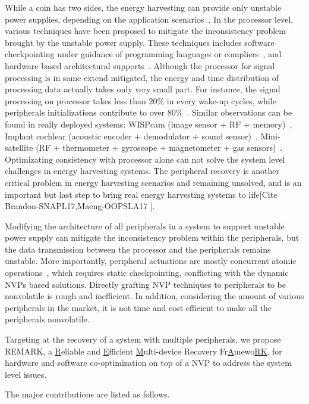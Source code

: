 While a coin has two sides, the energy harvesting can provide only unstable power supplies, depending on the application scenarios~\cite{}.
In the processor level, various techniques have been proposed to mitigate the inconsistency problem brought by the unstable power supply.
These techniques includes software checkpointing under guidance of programming languages or compliers~\cite{}, and hardware based architectural supports~\cite{}.
Although the processor for signal processing is in same extend mitigated, the energy and time distribution of processing data actually takes only very small part.
For instance, the signal processing on processor takes less than 20\% in every wake-up cycles, while peripherals initializations contribute to over 80\%~\cite{}.
Similar observations can be found in really deployed systems: 
WISPcam (image sensor + RF + memory)~\cite{}, Implant cochlear (acoustic encoder + demodulator + sound sensor)~\cite{}, Mini-satellite (RF + thermometer + gyroscope + magnetometer + gas sensors)~\cite{}.
Optimizating consistency with processor alone can not solve the system level challenges in energy harvesting systems.
The peripheral recovery is another critical problem in energy harvesting scenarios and remaining unsolved, and is an important but last step to bring real energy 
harvesting systems to life[Cite Brandon-SNAPL17,Maeng-OOPSLA17 ].

Modifying the architecture of all peripherals in a system to support unstable power supply can mitigate the inconsistency problem within the peripherals, but the data transmission between the processor
and the peripherals remains unstable. 
More importantly, peripheral actuations are mostly concurrent atomic operations~\cite{Lucia2017}, which requires static checkpointing, conflicting with the dynamic NVPs based solutions. Directly grafting NVP techniques to peripherals to be nonvolatile is rough and inefficient.
In addition, considering the amount of various peripherals in the market, it is not time and cost efficient to make all the peripherals nonvolatile.


Targeting at the recovery of a system with multiple peripherals, we propose REMARK, a \underline{R}eliable and \underline{E}fficient \underline{M}ulti-device Recovery Fr\underline{A}mewo\underline{RK}, for hardware and software co-optimization on top of a NVP to address the system level issues.


The major contributions are listed as follows.

